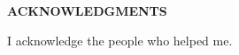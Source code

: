 \providecommand\phantomsection{} \phantomsection
\thispagestyle{plain}
\renewcommand{\headrulewidth}{0pt}
\renewcommand{\baselinestretch}{1}\small\normalsize
\begin{center}
\vspace*{0.375in}
\textbf{ACKNOWLEDGMENTS}\\[3\baselineskip]
\end{center}
\renewcommand{\baselinestretch}{1.66} \small\normalsize%
I acknowledge the people who helped me.




\newpage